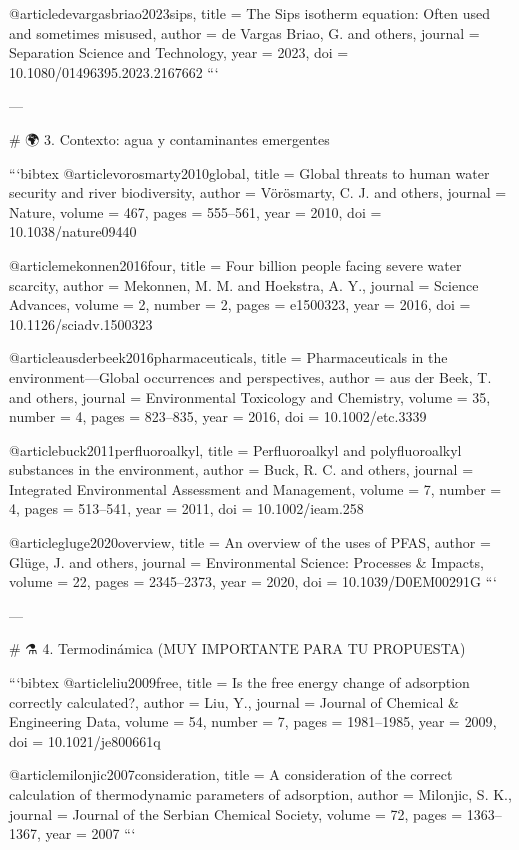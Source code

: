 @article{devargasbriao2023sips,
	title = {The Sips isotherm equation: Often used and sometimes misused},
	author = {de Vargas Briao, G. and others},
	journal = {Separation Science and Technology},
	year = {2023},
	doi = {10.1080/01496395.2023.2167662}
}
```

---

# 🌍 3. Contexto: agua y contaminantes emergentes

```bibtex
@article{vorosmarty2010global,
	title = {Global threats to human water security and river biodiversity},
	author = {Vörösmarty, C. J. and others},
	journal = {Nature},
	volume = {467},
	pages = {555--561},
	year = {2010},
	doi = {10.1038/nature09440}
}

@article{mekonnen2016four,
	title = {Four billion people facing severe water scarcity},
	author = {Mekonnen, M. M. and Hoekstra, A. Y.},
	journal = {Science Advances},
	volume = {2},
	number = {2},
	pages = {e1500323},
	year = {2016},
	doi = {10.1126/sciadv.1500323}
}

@article{ausderbeek2016pharmaceuticals,
	title = {Pharmaceuticals in the environment---Global occurrences and perspectives},
	author = {aus der Beek, T. and others},
	journal = {Environmental Toxicology and Chemistry},
	volume = {35},
	number = {4},
	pages = {823--835},
	year = {2016},
	doi = {10.1002/etc.3339}
}

@article{buck2011perfluoroalkyl,
	title = {Perfluoroalkyl and polyfluoroalkyl substances in the environment},
	author = {Buck, R. C. and others},
	journal = {Integrated Environmental Assessment and Management},
	volume = {7},
	number = {4},
	pages = {513--541},
	year = {2011},
	doi = {10.1002/ieam.258}
}

@article{gluge2020overview,
	title = {An overview of the uses of PFAS},
	author = {Gl{\"u}ge, J. and others},
	journal = {Environmental Science: Processes \& Impacts},
	volume = {22},
	pages = {2345--2373},
	year = {2020},
	doi = {10.1039/D0EM00291G}
}
```

---

# ⚗️ 4. Termodinámica (MUY IMPORTANTE PARA TU PROPUESTA)

```bibtex
@article{liu2009free,
	title = {Is the free energy change of adsorption correctly calculated?},
	author = {Liu, Y.},
	journal = {Journal of Chemical \& Engineering Data},
	volume = {54},
	number = {7},
	pages = {1981--1985},
	year = {2009},
	doi = {10.1021/je800661q}
}

@article{milonjic2007consideration,
	title = {A consideration of the correct calculation of thermodynamic parameters of adsorption},
	author = {Milonjic, S. K.},
	journal = {Journal of the Serbian Chemical Society},
	volume = {72},
	pages = {1363--1367},
	year = {2007}
}
```

